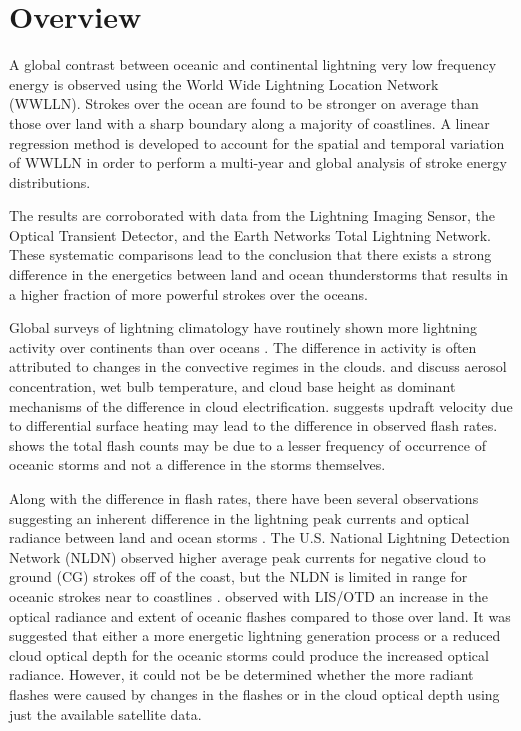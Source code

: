 \section{Overview}

A global contrast between oceanic and continental lightning very low frequency energy is observed using the World Wide Lightning Location Network (WWLLN).
Strokes over the ocean are found to be stronger on average than those over land with a sharp boundary along a majority of coastlines.
A linear regression method is developed to account for the spatial and temporal variation of WWLLN in order to perform a multi-year and global analysis of stroke energy distributions.

The results are corroborated with data from the Lightning Imaging Sensor, the Optical Transient Detector, and the Earth Networks Total Lightning Network.
These systematic comparisons lead to the conclusion that there exists a strong difference in the energetics between land and ocean thunderstorms that results in a higher fraction of more powerful strokes over the oceans. 

Global surveys of lightning climatology have routinely shown more lightning activity over continents than over oceans \citep{Christian2003}.
The difference in activity is often attributed to changes in the convective regimes in the clouds.
\citet{Williams2002} and \citet{Williams2005} discuss aerosol concentration, wet bulb temperature, and cloud base height as dominant mechanisms of the difference in cloud electrification.
\citet{Zipser1994} suggests updraft velocity due to differential surface heating may lead to the difference in observed flash rates.
\citet{Boccippio2000} shows the total flash counts may be due to a lesser frequency of occurrence of oceanic storms and not a difference in the storms themselves.

Along with the difference in flash rates, there have been several observations suggesting an inherent difference in the lightning peak currents and optical radiance between land and ocean storms \citep{Seity2001, Ishii2010}. 
The U.S. National Lightning Detection Network (NLDN) observed higher average peak currents for negative cloud to ground (CG) strokes off of the coast, but the NLDN is limited in range for oceanic strokes near to coastlines \citep{Rudlosky2010, Lyons1998}.
\citet{Boccippio2000} observed with LIS/OTD an increase in the optical radiance and extent of oceanic flashes compared to those over land.
It was suggested that either a more energetic lightning generation process or a reduced cloud optical depth for the oceanic storms could produce the increased optical radiance.
However, it could not be be determined whether the more radiant flashes were caused by changes in the flashes or in the cloud optical depth using just the available satellite data.

